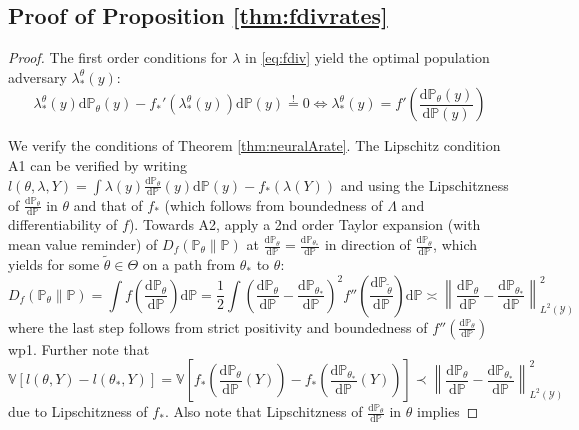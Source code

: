 \documentclass[12pt]{article}
\def\D{\mathrm{d}}
\theoremstyle{myplain}
\theoremstyle{definition}
\theoremstyle{definition}
\theoremstyle{remark}
\numberwithin{equation}{section}
\begin{document}
\subsection{Proof of Proposition \ref{thm:fdivrates}}
\begin{proof}
The first order conditions for $\lambda$ in \ref{eq:fdiv} yield the optimal population adversary $\lambda_*^\theta(y)$:
\begin{equation}
    \lambda_*^\theta(y) \D\mathbb{P}_\theta(y) - f_*'(\lambda_*^\theta(y)) \D\mathbb{P}(y) \overset{!}{=} 0 \iff \lambda_*^\theta(y) = f'\left(\frac{\D\mathbb{P}_\theta(y)}{\D\mathbb{P}(y)}\right)
\end{equation}

We verify the conditions of Theorem \ref{thm:neuralArate}. The Lipschitz condition A1 can be verified by writing $l(\theta,\lambda, Y)=\int \lambda(y) \frac{\D\mathbb{P}_\theta}{\D\mathbb{P}}(y) \D\mathbb{P}(y) - f_*(\lambda(Y))$ and using the Lipschitzness of $ \frac{\D\mathbb{P}_\theta}{\D\mathbb{P}}$ in $\theta$ and that of $f_*$ (which follows from boundedness of $\Lambda$ and differentiability of $f$). Towards A2, apply a 2nd order Taylor expansion (with mean value reminder) of $D_f(\mathbb{P}_\theta\|\mathbb{P})$ at $\frac{\D\mathbb{P}_\theta}{\D\mathbb{P}}=\frac{\D\mathbb{P}_{\theta_*}}{\D\mathbb{P}}$ in direction of $\frac{\D\mathbb{P}_\theta}{\D\mathbb{P}}$, which yields for some $\widetilde{\theta}\in\Theta$ on a path from $\theta_*$ to $\theta$:
\begin{equation*}
D_f(\mathbb{P}_\theta\|\mathbb{P}) = \int f\left(\frac{\D\mathbb{P}_\theta}{\D\mathbb{P}}\right) \D\mathbb{P} = \frac{1}{2}\int \left(\frac{\D\mathbb{P}_\theta}{\D\mathbb{P}}-\frac{\D\mathbb{P}_{\theta_*}}{\D\mathbb{P}}\right)^2 f''\left(\frac{\D\mathbb{P}_{\widetilde{\theta}}}{\D\mathbb{P}}\right)\D\mathbb{P}\asymp \left\|\frac{\D\mathbb{P}_\theta}{\D\mathbb{P}}-\frac{\D\mathbb{P}_{\theta_*}}{\D\mathbb{P}}\right\|_{L^2(\mathcal{Y})}^2
\end{equation*}
where the last step follows from strict positivity and boundedness of $f''\left(\frac{\D\mathbb{P}_\theta}{\D\mathbb{P}}\right)$ wp1. Further note that 
$$\mathbb{V}[l(\theta, Y)-l(\theta_*, Y)]=\mathbb{V}\left[f_*\left(\frac{\D\mathbb{P}_\theta}{\D\mathbb{P}}(Y)\right)-f_*\left(\frac{\D\mathbb{P}_{\theta_*}}{\D\mathbb{P}}(Y)\right)\right]\prec \left\|\frac{\D\mathbb{P}_\theta}{\D\mathbb{P}}-\frac{\D\mathbb{P}_{\theta_*}}{\D\mathbb{P}}\right\|_{L^2(\mathcal{Y})}^2$$
due to Lipschitzness of $f_*$. Also note that Lipschitzness of $\frac{\D\mathbb{P}_\theta}{\D\mathbb{P}}$ in $\theta$ implies

\end{proof}
\end{document}
